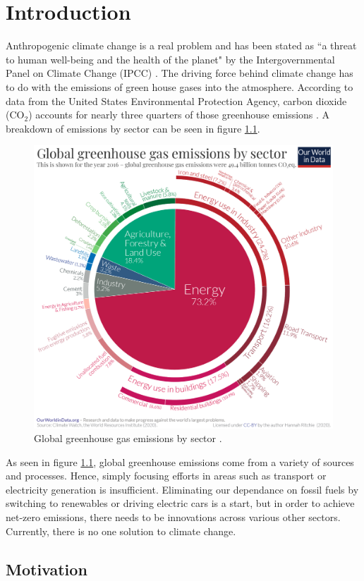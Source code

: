\chapter{Introduction}

Anthropogenic climate change is a real problem and has been stated as ``a threat to human well-being and the health of the planet" by the Intergovernmental Panel on Climate Change (IPCC) \cite{ipcc_2022}. The driving force behind climate change has to do with the emissions of green house gases into the atmosphere. According to data from the United States Environmental Protection Agency, carbon dioxide (CO$_2$) accounts for nearly three quarters of those greenhouse emissions \cite{epa_2019}. A breakdown of emissions by sector can be seen in figure \ref{fig:green_house_gas_emissions}.

\begin{figure}[h!]
	\centering
	\includegraphics[width=0.7\linewidth]{chapter_1/figures/emissions.png}
	\caption{Global greenhouse gas emissions by sector \cite{ritchie_roser_2020}.}
	\label{fig:green_house_gas_emissions}
\end{figure} 

As seen in figure \ref{fig:green_house_gas_emissions}, global greenhouse emissions come from a variety of sources and processes. Hence, simply focusing efforts in areas such as transport or electricity generation is insufficient. Eliminating our dependance on fossil fuels by switching to renewables or driving electric cars is a start, but in order to achieve net-zero emissions, there needs to be innovations across various other sectors. Currently, there is no one solution to  climate change.

\section{Motivation}

